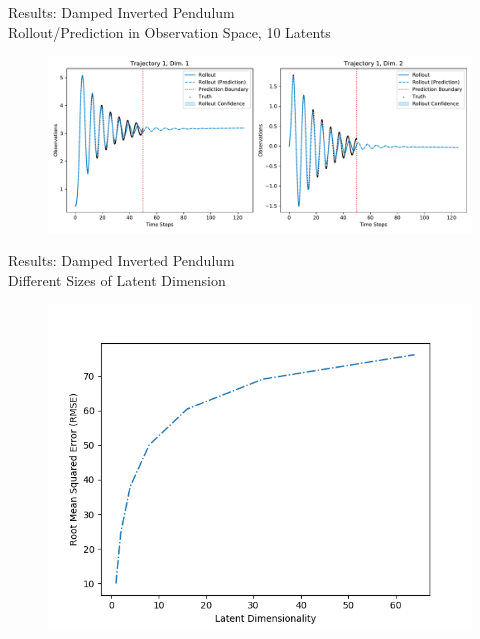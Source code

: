 \documentclass[
	aspectratio=43,
	color={accentcolor=1c},
	logo=false,
	colorframetitle=true,
]{tudabeamer}
\begin{document}
			\begin{frame}{Results: Damped Inverted Pendulum \\ Rollout/Prediction in Observation Space, 10 Latents} %
				\vspace{-0.4cm}
				\begin{figure}
					\centering
					\includegraphics[width = \textwidth]{figures/results/pendulum/rollout-observations.pdf}
				\end{figure}
			\end{frame}

			\begin{frame}{Results: Damped Inverted Pendulum \\ Different Sizes of Latent Dimension}
				\vspace{-0.4cm}
				\begin{figure}
					\centering
					\includegraphics[height = 0.8\textheight]{figures/fake/rmse}
				\end{figure}
			\end{frame}
\end{document}
